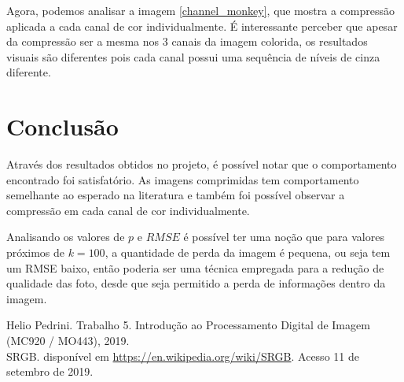 \documentclass[conference]{IEEEtran}
\begin{document}
    Agora, podemos analisar a imagem \ref{channel_monkey}, que mostra a compressão aplicada a cada canal de cor individualmente. É interessante perceber que apesar da compressão ser a mesma nos 3 canais da imagem colorida, os resultados visuais são diferentes pois cada canal possui uma sequência de níveis de cinza diferente.


\section{Conclusão}

    Através dos resultados obtidos no projeto, é possível notar que o comportamento encontrado foi satisfatório.
    As imagens comprimidas tem comportamento semelhante ao esperado na literatura e também foi possível observar a compressão em cada canal de cor individualmente.

    Analisando os valores de $p$ e $RMSE$ é possível ter uma noção que para valores próximos de $k = 100$, a quantidade de perda da imagem é pequena, ou seja tem um RMSE baixo, então poderia ser uma técnica empregada para a redução de qualidade das foto, desde que seja permitido a perda de informações dentro da imagem.

\begin{thebibliography}{00}

   Helio Pedrini. Trabalho 5. Introdução ao Processamento Digital de Imagem (MC920 / MO443), 2019.\\

   SRGB. disponível em \url{https://en.wikipedia.org/wiki/SRGB}. Acesso 11 de setembro de 2019.

\end{thebibliography}
\end{document}
